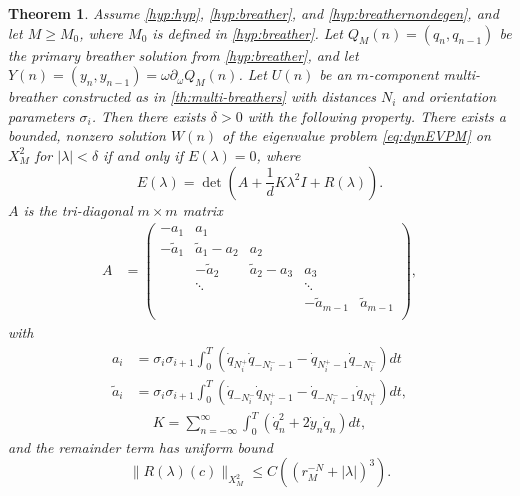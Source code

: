 \documentclass[12pt,reqno]{amsart}
\newtheorem{theorem}{Theorem}
\theoremstyle{definition}
\begin{document}
\begin{theorem}\label{th:spectrum}
Assume \cref{hyp:hyp}, \cref{hyp:breather}, and \cref{hyp:breathernondegen}, and let $M \geq M_0$, where $M_0$ is defined in \cref{hyp:breather}. Let $Q_M(n) = (q_n, q_{n-1})$ be the primary breather solution from \cref{hyp:breather}, and let $Y(n) = (y_n, y_{n-1}) = \omega \partial_\omega Q_M(n)$.
Let $U(n)$ be an $m$-component multi-breather constructed as in \cref{th:multi-breathers} with distances $N_i$ and orientation parameters $\sigma_i$. Then there exists $\delta > 0$ with the following property. There exists a bounded, nonzero solution $W(n)$ of the eigenvalue problem \cref{eq:dynEVPM} on $X_M^2$ for $|\lambda| < \delta$ if and only if $E(\lambda) = 0$, where
\begin{equation}\label{Elambda}
E(\lambda) = \det\left(A + \frac{1}{d}K \lambda^2 I + R(\lambda)\right).
\end{equation}
$A$ is the tri-diagonal $m \times m$ matrix
\begin{align}\label{eq:matrixA}
A &= \begin{pmatrix}
-a_1 & a_1 & & & \\
-\tilde{a}_1 & \tilde{a}_1 - a_2 & a_2 \\
& -\tilde{a}_2 & \tilde{a}_2 - a_3 & a_3 \\
& \ddots & & \ddots \\
& & & -\tilde{a}_{m-1} & \tilde{a}_{m-1}  \\
\end{pmatrix},
\end{align}
with
\begin{equation}\label{eq:ai}
\begin{aligned}
a_i &= \sigma_i \sigma_{i+1} \int_0^T \left( \dot{q}_{N_i^+}\dot{q}_{-N_i^- - 1} 
- \dot{q}_{N_i^+ - 1}\dot{q}_{-N_i^-} \right) dt \\
\tilde{a}_i &= \sigma_i \sigma_{i+1} \int_0^T \left( \dot{q}_{-N_i^-} \dot{q}_{N_i^+ - 1} 
- \dot{q}_{-N_i^- - 1}\dot{q}_{N_i^+} \right) dt,
\end{aligned}
\end{equation}
\begin{align}\label{eq:M}
K =
\sum_{n = -\infty}^\infty \int_0^T \left( \dot{q}_n^2 + 2 \dot{y}_n \dot{q}_n \right) dt,
\end{align}
and the remainder term has uniform bound
\begin{equation}\label{eq:Rbound}
\|R(\lambda)(c)\|_{X_M^2} \leq C \left( (r_M^{-N} + |\lambda|)^3\right).
\end{equation}
\end{theorem}
\end{document}
